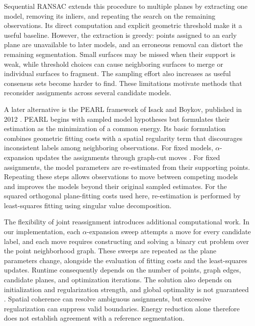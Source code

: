 Sequential RANSAC extends this procedure to multiple planes by extracting one model, removing its inliers, and repeating the search on the remaining observations. Its direct computation and explicit geometric threshold make it a useful baseline. However, the extraction is greedy: points assigned to an early plane are unavailable to later models, and an erroneous removal can distort the remaining segmentation. Small surfaces may be missed when their support is weak, while threshold choices can cause neighboring surfaces to merge or individual surfaces to fragment. The sampling effort also increases as useful consensus sets become harder to find. These limitations motivate methods that reconsider assignments across several candidate models.

A later alternative is the PEARL framework of Isack and Boykov, published in 2012 \cite{isack2012energy}. PEARL begins with sampled model hypotheses but formulates their estimation as the minimization of a common energy. Its basic formulation combines geometric fitting costs with a spatial regularity term that discourages inconsistent labels among neighboring observations. For fixed models, \(\alpha\)-expansion updates the assignments through graph-cut moves \cite{boykov2001graphcuts}. For fixed assignments, the model parameters are re-estimated from their supporting points. Repeating these steps allows observations to move between competing models and improves the models beyond their original sampled estimates. For the squared orthogonal plane-fitting costs used here, re-estimation is performed by least-squares fitting using singular value decomposition.

The flexibility of joint reassignment introduces additional computational work. In our implementation, each \(\alpha\)-expansion sweep attempts a move for every candidate label, and each move requires constructing and solving a binary cut problem over the point neighborhood graph. These sweeps are repeated as the plane parameters change, alongside the evaluation of fitting costs and the least-squares updates. Runtime consequently depends on the number of points, graph edges, candidate planes, and optimization iterations. The solution also depends on initialization and regularization strength, and global optimality is not guaranteed \cite{isack2012energy}. Spatial coherence can resolve ambiguous assignments, but excessive regularization can suppress valid boundaries. Energy reduction alone therefore does not establish agreement with a reference segmentation.

